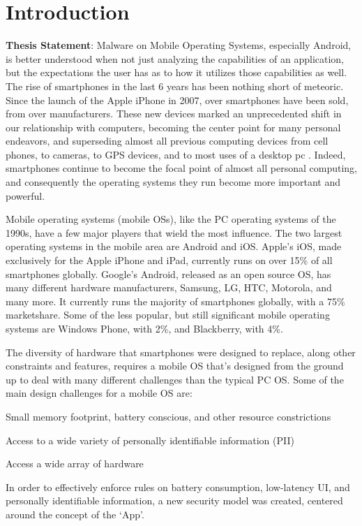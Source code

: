 \chapter{Introduction}
\label{sec:intro}

\textbf{Thesis Statement}: Malware on Mobile Operating Systems, especially Android, is better understood when not just analyzing the capabilities of an application, but the expectations the user has as to how it utilizes those capabilities as well.\\


The rise of smartphones in the last 6 years has been nothing short of meteoric. Since the launch of the Apple iPhone in 2007, over  smartphones have been sold, from over  manufacturers. These new devices marked an unprecedented shift in our relationship with computers, becoming the center point for many personal endeavors, and superseding almost all previous computing devices from cell phones, to cameras, to GPS devices, and to most uses of a desktop pc . Indeed, smartphones continue to become the focal point of almost all personal computing, and consequently the operating systems they run become more important and powerful.

Mobile operating systems (mobile OSs), like the PC operating systems of the 1990s, have a few major players that wield the most influence. The two largest operating systems in the mobile area are Android and iOS. Apple’s iOS, made exclusively for the Apple iPhone and iPad, currently runs on over 15\% of all smartphones globally. Google’s Android, released as an open source OS, has many different hardware manufacturers, Samsung, LG, HTC, Motorola, and many more. It currently runs the majority of smartphones globally, with a 75\% marketshare. Some of the less popular, but still significant mobile operating systems are Windows Phone, with 2\%, and Blackberry, with 4\%. 


The diversity of hardware that smartphones were designed to replace, along other constraints and features, requires a mobile OS that’s designed from the ground up to deal with many different challenges than the typical PC OS. Some of the main design challenges for a mobile OS are: 
\begin{smitemize}

\item Small memory footprint, battery conscious, and other resource constrictions

\item Access to a wide variety of personally identifiable information (PII)

\item Access a wide array of hardware

\end{smitemize}
In order to effectively enforce rules on battery consumption, low-latency UI, and personally identifiable information, a new security model was created, centered around the concept of the ‘App’. 

